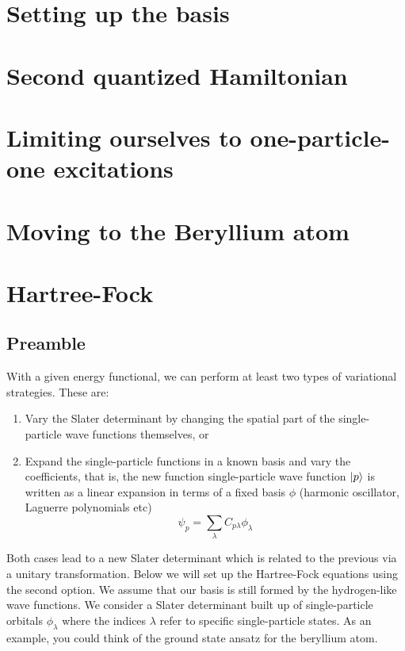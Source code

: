 \documentclass{article}
\DeclarePairedDelimiter\ket{\lvert}{\rangle}
\begin{document}
\section{Setting up the basis}


\section{Second quantized Hamiltonian}
% 

\section{Limiting ourselves to one-particle-one excitations}


\section{Moving to the Beryllium atom}


\section{Hartree-Fock}
\subsection*{Preamble}
With a given energy functional, we can perform at least two types of variational strategies.
These are:
\begin{enumerate}
    \item Vary the Slater determinant by changing the spatial part of the single-particle wave functions themselves, or

    \item Expand the single-particle functions in a known basis  and vary the coefficients, that is, the new function single-particle wave function $\ket{p}$ is written as a linear expansion in terms of a fixed basis $\phi$ (harmonic oscillator, Laguerre polynomials etc)
        \begin{equation*}
            \psi_p  = \sum_{\lambda} C_{p\lambda}\phi_{\lambda}
        \end{equation*}
\end{enumerate}
Both cases lead to a new Slater determinant which is related to the previous via a unitary transformation.
Below we will set up the Hartree-Fock equations using the second option.
We assume that our basis is still formed by the hydrogen-like wave functions.
We consider a Slater determinant built up of single-particle orbitals $\phi_{\lambda}$ where the indices $\lambda$ refer to specific single-particle states.
As an example, you could think of the ground state ansatz for the beryllium atom.
\end{document}
